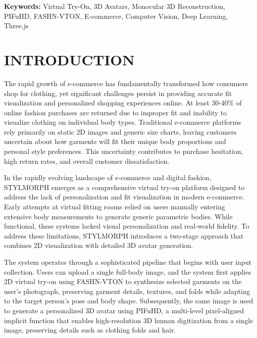 \documentclass[12pt,a4paper,oneside]{report}
\begin{document}
\vspace{0.3cm}

\noindent
\textbf{Keywords:} Virtual Try-On, 3D Avatars, Monocular 3D Reconstruction, PIFuHD, FASHN-VTON, E-commerce, Computer Vision, Deep Learning, Three.js

\tableofcontents
\listoffigures
\listoftables

\newpage
\pagestyle{fancy}
\chapter{INTRODUCTION}

The rapid growth of e-commerce has fundamentally transformed how consumers shop for clothing, yet significant challenges persist in providing accurate fit visualization and personalized shopping experiences online. At least 30-40\% of online fashion purchases are returned due to improper fit and inability to visualize clothing on individual body types. Traditional e-commerce platforms rely primarily on static 2D images and generic size charts, leaving customers uncertain about how garments will fit their unique body proportions and personal style preferences. This uncertainty contributes to purchase hesitation, high return rates, and overall customer dissatisfaction.

In the rapidly evolving landscape of e-commerce and digital fashion, STYLMORPH emerges as a comprehensive virtual try-on platform designed to address the lack of personalization and fit visualization in modern e-commerce. Early attempts at virtual fitting rooms relied on users manually entering extensive body measurements to generate generic parametric bodies. While functional, these systems lacked visual personalization and real-world fidelity. To address these limitations, STYLMORPH introduces a two-stage approach that combines 2D visualization with detailed 3D avatar generation.

The system operates through a sophisticated pipeline that begins with user input collection. Users can upload a single full-body image, and the system first applies 2D virtual try-on using FASHN-VTON to synthesize selected garments on the user's photograph, preserving garment details, textures, and folds while adapting to the target person's pose and body shape. Subsequently, the same image is used to generate a personalized 3D avatar using PIFuHD, a multi-level pixel-aligned implicit function that enables high-resolution 3D human digitization from a single image, preserving details such as clothing folds and hair.
\end{document}
